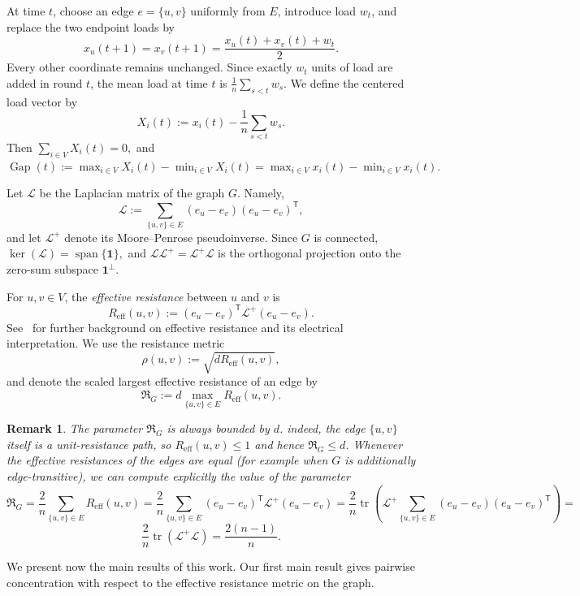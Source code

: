 \documentclass[11pt]{article}
\numberwithin{equation}{section}
\newtheorem{remark}[theorem]{Remark}
\newcommand{\1}{\mathbf{1}}
\newcommand{\Gap}{\operatorname{Gap}}
\begin{document}
\medskip

At time \(t\), choose an edge \(e=\{u,v\}\) uniformly from \(E\), introduce load \(w_t\), and replace the two endpoint loads by
\[
x_u(t+1)
=
x_v(t+1)
=
\frac{x_u(t)+x_v(t)+w_t}{2}.
\]
Every other coordinate remains unchanged. Since exactly \(w_t\) units of load are added in round \(t\), the mean load at time \(t\) is
\(
\frac1n\sum_{s<t}w_s.
\)
We define the centered load vector by
\[
X_i(t)
:=
x_i(t)-\frac1n\sum_{s<t}w_s.
\]
Then
\(
\sum_{i\in V}X_i(t)=0,
\)
and 
\(
\Gap(t)
:=
\max_{i\in V}X_i(t)-\min_{i\in V}X_i(t)
=
\max_{i\in V}x_i(t)-\min_{i\in V}x_i(t).
\)

\medskip

Let \(\mathcal L\) be the Laplacian matrix of the graph $G$. Namely,
\[
\mathcal L
:=
\sum_{\{u,v\}\in E}
(e_u-e_v)(e_u-e_v)^{\mathsf T},
\]
and let \(\mathcal L^+\) denote its Moore--Penrose pseudoinverse. Since \(G\) is connected,
\(
\ker(\mathcal L)=\operatorname{span}\{\1\},
\)
and \(\mathcal L\mathcal L^+=\mathcal L^+\mathcal L\) is the orthogonal projection onto the zero-sum subspace \(\1^\perp\).

\medskip

For \(u,v\in V\), the \emph{effective resistance} between \(u\) and \(v\) is
\[
R_{\mathrm{eff}}(u,v)
:=
(e_u-e_v)^{\mathsf T}
\mathcal L^+
(e_u-e_v).
\]
See~\cite{KleinRandic,LyonsPeres} for further background on effective resistance and its electrical interpretation. We use the resistance metric
\[
\rho(u,v):=\sqrt{dR_{\mathrm{eff}}(u,v)},
\]
and denote the scaled largest effective resistance of an edge by
\[
\Re_G
:=
 d\max_{\{u,v\}\in E}R_{\mathrm{eff}}(u,v).
\]


\begin{remark} \label{rem:sameER}
    The parameter \(\Re_G\) is always bounded by $d$. indeed, the edge \(\{u,v\}\) itself is a unit-resistance path, so \(R_{\mathrm{eff}}(u,v)\le1\) and hence \(\Re_G\le d\). Whenever the effective resistances of the edges are equal (for example when \(G\) is additionally edge-transitive), we can compute explicitly the value of the parameter 
\[
\Re_G
=\frac 2 n \sum_{\{u,v\}\in E}R_{\mathrm{eff}}(u,v)
=\frac 2 n\sum_{\{u,v\}\in E}
(e_u-e_v)^{\mathsf T}\mathcal L^+(e_u-e_v)=
\frac 2 n\operatorname{tr}\left(
\mathcal L^+
\sum_{\{u,v\}\in E}
(e_u-e_v)(e_u-e_v)^{\mathsf T}
\right)=
\]
\[
\frac 2 n \operatorname{tr}(\mathcal L^+\mathcal L)
= \frac{2(n-1)}{n}.
\]
\end{remark}


We present now the main results of this work. Our first main result gives pairwise concentration with respect to the effective resistance metric on the graph.
\end{document}
